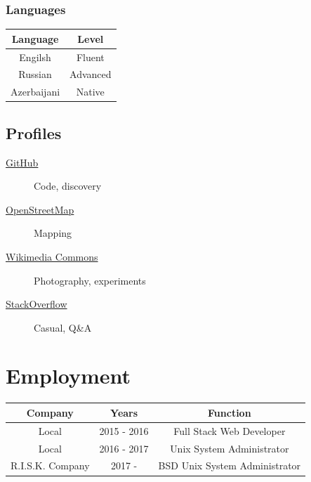 \documentclass {article}
\begin{document}
    \subsubsection{Languages}
    \begin{center}
      \begin {tabular} { | c | c  | }
        \hline			
        \textbf {Language} & \textbf {Level} \\
        \hline  
        Engilsh & Fluent \\
        Russian & Advanced \\
        Azerbaijani & Native \\
        \hline  
      \end{tabular}
    \end{center}

     \subsection{Profiles}
       \begin{description}
         \item[\href{https://github.com/rwp0}{GitHub}] Code, discovery
         \item[\href{https://www.openstreetmap.org/user/rwp_}{OpenStreetMap}] Mapping
         \item[\href{https://commons.wikimedia.org/wiki/User:Rwp0}{Wikimedia Commons}] Photography, experiments
         \item[\href{https://stackoverflow.com/users/13762488/rwp}{StackOverflow}] Casual, Q\&A
       \end{description}

  \section{Employment}
    \begin{center}
      \begin {tabular} { | c | c | c  | }
        \hline			
        \textbf {Company} & \textbf {Years} & \textbf {Function} \\
        \hline  
        Local & 2015 - 2016 & Full Stack Web Developer \\
        Local & 2016 - 2017 & Unix System Administrator \\
        R.I.S.K. Company & 2017 - & BSD Unix System Administrator \\
        \hline  
      \end{tabular}
    \end{center}
\end{document}

